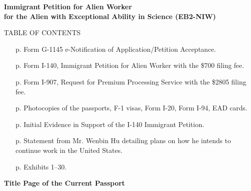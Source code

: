 \documentclass{article}
\begin{document}

\vspace*{\fill}
\begin{center}

{\bf 
Immigrant Petition for Alien Worker\\
for the Alien with Exceptional Ability in Science (EB2-NIW)
}

\end{center}
\vspace*{\fill}

\begin{center}
TABLE OF CONTENTS
\end{center}
\begin{itemize}
    \item [p. \pageref*{G-1145}] Form G-1145 e-Notification of Application/Petition Acceptance. 
    \item [p. \pageref*{I-140}] Form I-140, Immigrant Petition for Alien Worker with the \$700 filing fee.
    \item [p. \pageref*{I-907}] Form I-907, Request for Premium Processing Service with the \$2805 filing fee.
    \item [p. \pageref*{docs}] Photocopies of the passports, F-1 visas, Form I-20, Form I-94, EAD cards.
    \item [p. \pageref*{IE}] Initial Evidence in Support of the I-140 Immigrant Petition.
    \item [p. \pageref*{plans}] Statement from Mr. Wenbin Hu detailing plans on how he intends to continue work in the United States.
    \item [p. \pageref*{exhib}] Exhibits 1–30.
\end{itemize}

\clearpage
\label{G-1145}


\label{I-140}


\label{I-907}


\vspace*{\fill}
\begin{center}

{\LARGE \bf
Title Page of the Current Passport
}
\label{docs}
\end{center}
\vspace*{\fill}
\end{document}
